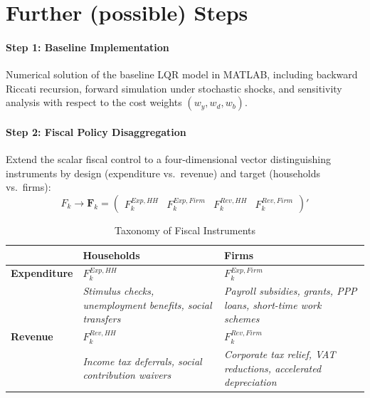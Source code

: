 \documentclass[12pt, a4paper]{article}
\begin{document}
\section{Further (possible) Steps}

\paragraph{Step 1: Baseline Implementation}
Numerical solution of the baseline LQR model in MATLAB, including 
backward Riccati recursion, forward simulation under stochastic 
shocks, and sensitivity analysis with respect to the cost weights 
$(w_y, w_d, w_b)$.


\paragraph{Step 2: Fiscal Policy Disaggregation}
Extend the scalar fiscal control to a four-dimensional vector 
distinguishing instruments by design (expenditure vs.\ revenue) 
and target (households vs.\ firms):
\begin{equation}
    F_k \to \bm{F}_k = 
    \begin{pmatrix} 
        F_k^{Exp,HH} & F_k^{Exp,Firm} & F_k^{Rev,HH} & F_k^{Rev,Firm} 
    \end{pmatrix}'
\end{equation}

\begin{table}[h]
\centering
\caption{Taxonomy of Fiscal Instruments}
\label{tab:fiscal_taxonomy}
\renewcommand{\arraystretch}{1.4}
\begin{tabular}{p{3cm} p{5cm} p{5cm}}
\toprule
 & \textbf{Households} & \textbf{Firms} \\
\midrule
\textbf{Expenditure} 
    & $F_k^{Exp,HH}$ 
    & $F_k^{Exp,Firm}$ \\
    & \small\textit{Stimulus checks, unemployment benefits, social transfers} 
    & \small\textit{Payroll subsidies, grants, PPP loans, short-time work schemes} \\[2ex]
\textbf{Revenue} 
    & $F_k^{Rev,HH}$ 
    & $F_k^{Rev,Firm}$ \\
    & \small\textit{Income tax deferrals, social contribution waivers} 
    & \small\textit{Corporate tax relief, VAT reductions, accelerated depreciation} \\
\bottomrule
\end{tabular}
\end{table}
\end{document}
